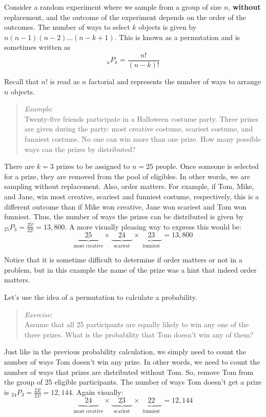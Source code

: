 \documentclass[
  letterpaper,
  DIV=11,
  numbers=noendperiod]{scrreprt}
\begin{document}
Consider a random experiment where we sample from a group of size \(n\),
\textbf{without} replacement, and the outcome of the experiment depends
on the order of the outcomes. The number of ways to select \(k\) objects
is given by \(n(n-1)(n-2)...(n-k+1)\). This is known as a permutation
and is sometimes written as \[
{}_nP_{k} = \frac{n!}{(n-k)!}
\]

Recall that \(n!\) is read as \(n\) factorial and represents the number
of ways to arrange \(n\) objects.

\begin{quote}
\emph{Example}:\\
Twenty-five friends participate in a Halloween costume party. Three
prizes are given during the party: most creative costume, scariest
costume, and funniest costume. No one can win more than one prize. How
many possible ways can the prizes by distributed?
\end{quote}

There are \(k=3\) prizes to be assigned to \(n=25\) people. Once someone
is selected for a prize, they are removed from the pool of eligibles. In
other words, we are sampling without replacement. Also, order matters.
For example, if Tom, Mike, and Jane, win most creative, scariest and
funniest costume, respectively, this is a different outcome than if Mike
won creative, Jane won scariest and Tom won funniest. Thus, the number
of ways the prizes can be distributed is given by
\({}_{25}P_3 = \frac{25!}{22!} = 13,800\). A more visually pleasing way
to express this would be: \[
\underbrace{\underline{\quad 25 \quad }}_\text{most creative} \times \underbrace{\underline{\quad 24 \quad }}_\text{scariest} \times \underbrace{\underline{\quad 23 \quad }}_\text{funniest} = 13,800
\]

Notice that it is sometime difficult to determine if order matters or
not in a problem, but in this example the name of the prize was a hint
that indeed order matters.

Let's use the idea of a permutation to calculate a probability.

\begin{quote}
\emph{Exercise}:\\
Assume that all 25 participants are equally likely to win any one of the
three prizes. What is the probability that Tom doesn't win any of them?
\end{quote}

Just like in the previous probability calculation, we simply need to
count the number of ways Tom doesn't win any prize. In other words, we
need to count the number of ways that prizes are distributed without
Tom. So, remove Tom from the group of 25 eligible participants. The
number of ways Tom doesn't get a prize is
\({}_{24}P_3 = \frac{24!}{21!}=12,144\). Again visually: \[
\underbrace{\underline{\quad 24 \quad }}_\text{most creative} \times \underbrace{\underline{\quad 23 \quad }}_\text{scariest} \times \underbrace{\underline{\quad 22 \quad }}_\text{funniest} = 12,144
\]
\end{document}
